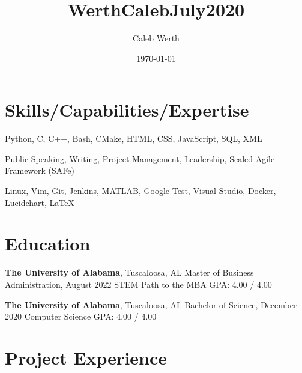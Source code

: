 \documentclass[hidelinks, 11pt]{article}
\title{WerthCalebJuly2020}
\author{Caleb Werth}
\date{\today}
\begin{document}
\makecvtitle
\vspace{0.5mm}

\section{Skills/Capabilities/Expertise}

\begin{description}[widest=Programming Langauges:]
  \item[Programming Languages:]	Python, C, C++, Bash, CMake, HTML, CSS, JavaScript, SQL, XML
  \item[Soft Skills:]	Public Speaking, Writing, Project Management, Leadership, Scaled Agile Framework (SAFe)
  \item[Tools:]	Linux, Vim, Git, Jenkins, MATLAB, Google Test, Visual Studio, Docker, Lucidchart, \color{blue}\href{https://github.com/chwerth/LaTeX_Resume}{LaTeX}
\end{description}\leavevmode

\section{Education}
\vspace{-1.4mm}
\begin{multicols}{2}

  \begin{minipage}{0.5\textwidth}
    \textbf{The University of Alabama}, Tuscaloosa, AL \newline
    Master of Business Administration, August 2022 \newline
    STEM Path to the MBA \newline
    GPA: 4.00 / 4.00
  \end{minipage}

  \begin{minipage}{0.5\textwidth}
    \textbf{The University of Alabama}, Tuscaloosa, AL \newline
    Bachelor of Science, December 2020 \newline
    Computer Science \newline
    GPA: 4.00 / 4.00
  \end{minipage}

\end{multicols}

\section{Project Experience}
\end{document}
